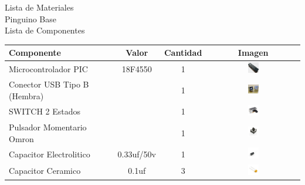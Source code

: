 \documentclass[a4paper,10pt]{book}
\title{\Titulo}
\author{\Autor}
\date{Noviembre 2011}
\begin{document}
\begin{center}
  Lista de Materiales \\
  Pinguino Base \\
   \Large {Lista de Componentes}\\
   \begin{tabular}{| l | c | c |  c |}
     \hline
      {\bfseries Componente}		& {\bfseries Valor}	& {\bfseries Cantidad} 	& {\bfseries Imagen} \\ \hline
      Microcontrolador PIC		& 18F4550		& 1 			& \includegraphics[width=0.125\textwidth]{img/pic-18f4550.jpg} \\ \hline
      Conector USB Tipo B (Hembra)	& 			& 1 			& \includegraphics[width=0.125\textwidth]{img/usb-b.jpg} \\ \hline
      SWITCH 2 Estados			& 			& 1 			& \includegraphics[width=0.125\textwidth]{img/switch-vertical.jpg} \\ \hline
      Pulsador Momentario Omron 	& 			& 1 			& \includegraphics[width=0.125\textwidth]{img/pulsador.jpg} \\ \hline
      Capacitor Electrolitico	 	& 0.33uf/50v		& 1 			& \includegraphics[width=0.125\textwidth]{img/electrolitico.jpg} \\ \hline
      Capacitor Ceramico	 	& 0.1uf			& 3 			& \includegraphics[width=0.125\textwidth]{img/104.jpg} \\ \hline

\end{tabular}
\end{center}
\end{document}
